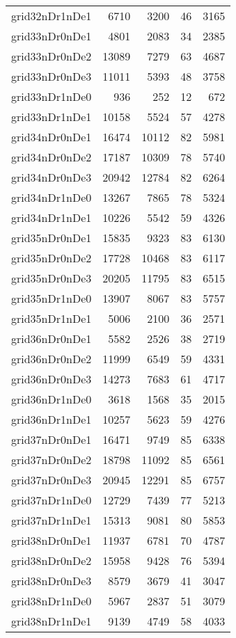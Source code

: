 \begin{longtable}{lrrrr}
grid32nDr1nDe1 & 6710 & 3200 & 46 & 3165 \\
grid33nDr0nDe1 & 4801 & 2083 & 34 & 2385 \\
grid33nDr0nDe2 & 13089 & 7279 & 63 & 4687 \\
grid33nDr0nDe3 & 11011 & 5393 & 48 & 3758 \\
grid33nDr1nDe0 & 936 & 252 & 12 & 672 \\
grid33nDr1nDe1 & 10158 & 5524 & 57 & 4278 \\
grid34nDr0nDe1 & 16474 & 10112 & 82 & 5981 \\
grid34nDr0nDe2 & 17187 & 10309 & 78 & 5740 \\
grid34nDr0nDe3 & 20942 & 12784 & 82 & 6264 \\
grid34nDr1nDe0 & 13267 & 7865 & 78 & 5324 \\
grid34nDr1nDe1 & 10226 & 5542 & 59 & 4326 \\
grid35nDr0nDe1 & 15835 & 9323 & 83 & 6130 \\
grid35nDr0nDe2 & 17728 & 10468 & 83 & 6117 \\
grid35nDr0nDe3 & 20205 & 11795 & 83 & 6515 \\
grid35nDr1nDe0 & 13907 & 8067 & 83 & 5757 \\
grid35nDr1nDe1 & 5006 & 2100 & 36 & 2571 \\
grid36nDr0nDe1 & 5582 & 2526 & 38 & 2719 \\
grid36nDr0nDe2 & 11999 & 6549 & 59 & 4331 \\
grid36nDr0nDe3 & 14273 & 7683 & 61 & 4717 \\
grid36nDr1nDe0 & 3618 & 1568 & 35 & 2015 \\
grid36nDr1nDe1 & 10257 & 5623 & 59 & 4276 \\
grid37nDr0nDe1 & 16471 & 9749 & 85 & 6338 \\
grid37nDr0nDe2 & 18798 & 11092 & 85 & 6561 \\
grid37nDr0nDe3 & 20945 & 12291 & 85 & 6757 \\
grid37nDr1nDe0 & 12729 & 7439 & 77 & 5213 \\
grid37nDr1nDe1 & 15313 & 9081 & 80 & 5853 \\
grid38nDr0nDe1 & 11937 & 6781 & 70 & 4787 \\
grid38nDr0nDe2 & 15958 & 9428 & 76 & 5394 \\
grid38nDr0nDe3 & 8579 & 3679 & 41 & 3047 \\
grid38nDr1nDe0 & 5967 & 2837 & 51 & 3079 \\
grid38nDr1nDe1 & 9139 & 4749 & 58 & 4033 \\

\end{longtable}
